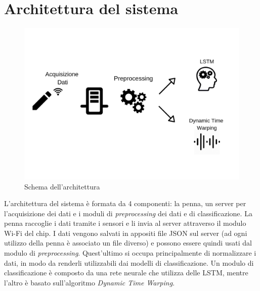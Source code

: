 \documentclass[8pt,notitlepage]{report}
\begin{document}
\chapter{Architettura del sistema}
	\begin{figure}[H]
		\begin{center}
			\includegraphics[scale=.25]{architettura}
			\caption{Schema dell'architettura}
		\end{center}
	\end{figure}		
	L'architettura del sistema è formata da 4 componenti: la penna, un server per l'acquisizione dei dati e i moduli di \textit{preprocessing} dei dati e di classificazione. La penna raccoglie i dati tramite i sensori e li invia al server attraverso il modulo Wi-Fi del chip. I dati vengono salvati in appositi file JSON sul server (ad ogni utilizzo della penna è associato un file diverso) e possono essere quindi usati dal modulo di \textit{preprocessing}. Quest'ultimo si occupa principalmente di normalizzare i dati, in modo da renderli utilizzabili dai modelli di classificazione. Un modulo di classificazione è composto da una rete neurale che utilizza delle LSTM, mentre l'altro è basato sull'algoritmo \textit{Dynamic Time Warping}.
\end{document}
